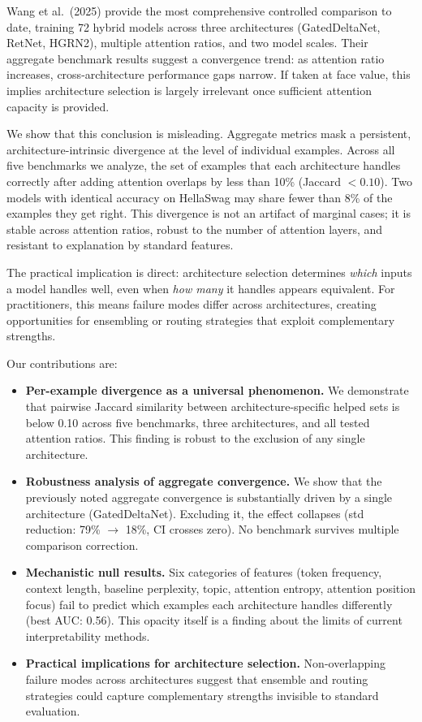\documentclass[11pt]{article}
\begin{document}
Wang et al.\ (2025) provide the most comprehensive controlled comparison to date, training 72 hybrid models across three architectures (GatedDeltaNet, RetNet, HGRN2), multiple attention ratios, and two model scales. Their aggregate benchmark results suggest a convergence trend: as attention ratio increases, cross-architecture performance gaps narrow. If taken at face value, this implies architecture selection is largely irrelevant once sufficient attention capacity is provided.

We show that this conclusion is misleading. Aggregate metrics mask a persistent, architecture-intrinsic divergence at the level of individual examples. Across all five benchmarks we analyze, the set of examples that each architecture handles correctly after adding attention overlaps by less than 10\% (Jaccard $< 0.10$). Two models with identical accuracy on HellaSwag may share fewer than 8\% of the examples they get right. This divergence is not an artifact of marginal cases; it is stable across attention ratios, robust to the number of attention layers, and resistant to explanation by standard features.

The practical implication is direct: architecture selection determines \emph{which} inputs a model handles well, even when \emph{how many} it handles appears equivalent. For practitioners, this means failure modes differ across architectures, creating opportunities for ensembling or routing strategies that exploit complementary strengths.

Our contributions are:
\begin{itemize}
    \item \textbf{Per-example divergence as a universal phenomenon.} We demonstrate that pairwise Jaccard similarity between architecture-specific helped sets is below 0.10 across five benchmarks, three architectures, and all tested attention ratios. This finding is robust to the exclusion of any single architecture.
    \item \textbf{Robustness analysis of aggregate convergence.} We show that the previously noted aggregate convergence is substantially driven by a single architecture (GatedDeltaNet). Excluding it, the effect collapses (std reduction: 79\% $\to$ 18\%, CI crosses zero). No benchmark survives multiple comparison correction.
    \item \textbf{Mechanistic null results.} Six categories of features (token frequency, context length, baseline perplexity, topic, attention entropy, attention position focus) fail to predict which examples each architecture handles differently (best AUC: 0.56). This opacity itself is a finding about the limits of current interpretability methods.
    \item \textbf{Practical implications for architecture selection.} Non-overlapping failure modes across architectures suggest that ensemble and routing strategies could capture complementary strengths invisible to standard evaluation.
\end{itemize}
\end{document}
